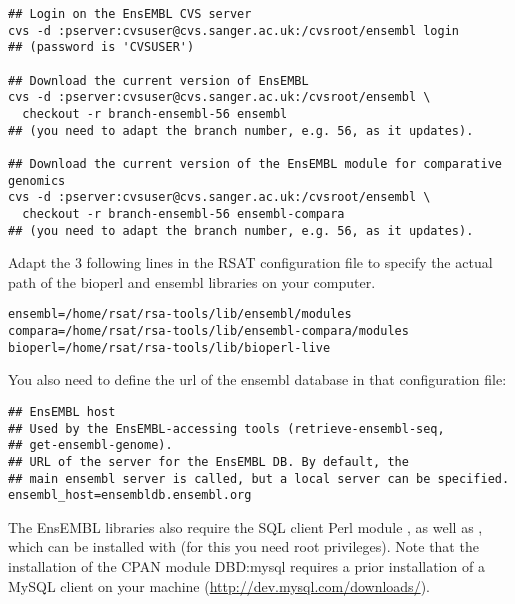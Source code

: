 \documentclass{book}
\begin{document}
\begin{footnotesize}
\begin{verbatim}
## Login on the EnsEMBL CVS server
cvs -d :pserver:cvsuser@cvs.sanger.ac.uk:/cvsroot/ensembl login
## (password is 'CVSUSER')

## Download the current version of EnsEMBL
cvs -d :pserver:cvsuser@cvs.sanger.ac.uk:/cvsroot/ensembl \
  checkout -r branch-ensembl-56 ensembl
## (you need to adapt the branch number, e.g. 56, as it updates).

## Download the current version of the EnsEMBL module for comparative genomics
cvs -d :pserver:cvsuser@cvs.sanger.ac.uk:/cvsroot/ensembl \
  checkout -r branch-ensembl-56 ensembl-compara
## (you need to adapt the branch number, e.g. 56, as it updates).
\end{verbatim}
\end{footnotesize}

Adapt the 3 following lines in the RSAT configuration file
 to specify the actual path of the bioperl
and ensembl libraries on your computer.

\begin{footnotesize}
\begin{verbatim}
ensembl=/home/rsat/rsa-tools/lib/ensembl/modules
compara=/home/rsat/rsa-tools/lib/ensembl-compara/modules
bioperl=/home/rsat/rsa-tools/lib/bioperl-live
\end{verbatim}
\end{footnotesize}

You also need to define the url of the ensembl database in that configuration file:

\begin{footnotesize}
\begin{verbatim}
## EnsEMBL host
## Used by the EnsEMBL-accessing tools (retrieve-ensembl-seq,
## get-ensembl-genome).
## URL of the server for the EnsEMBL DB. By default, the
## main ensembl server is called, but a local server can be specified.
ensembl_host=ensembldb.ensembl.org
\end{verbatim}
\end{footnotesize}

The EnsEMBL libraries also require the SQL client Perl module
, as well as , which can be installed with
\program{cpan} (for this you need root privileges). Note that the
installation of the CPAN module DBD:mysql requires a prior
installation of a MySQL client on your machine
(\url{http://dev.mysql.com/downloads/}).
\end{document}
